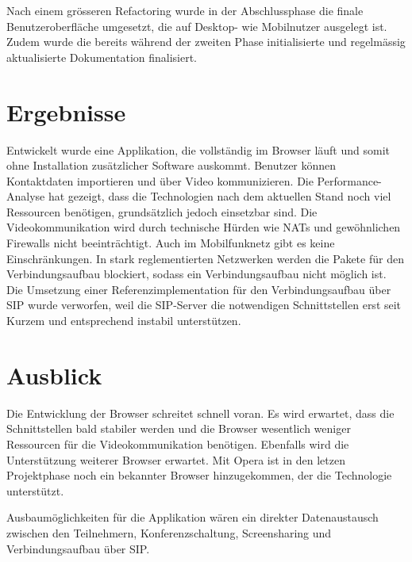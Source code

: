 Nach einem grösseren Refactoring wurde in der Abschlussphase die finale Benutzeroberfläche umgesetzt, die auf Desktop- wie Mobilnutzer ausgelegt ist.
Zudem wurde die bereits während der zweiten Phase initialisierte und regelmässig aktualisierte Dokumentation finalisiert.


\section{Ergebnisse}
Entwickelt wurde eine Applikation, die vollständig im Browser läuft und somit ohne Installation zusätzlicher Software auskommt.
Benutzer können Kontaktdaten importieren und über Video kommunizieren.
Die Performance-Analyse hat gezeigt, dass die Technologien nach dem aktuellen
Stand noch viel Ressourcen benötigen, grundsätzlich jedoch einsetzbar sind.
Die Videokommunikation wird durch technische Hürden wie NATs und gewöhnlichen Firewalls nicht beeinträchtigt. Auch im Mobilfunknetz gibt es keine Einschränkungen.
In stark reglementierten Netzwerken werden die Pakete für den Verbindungsaufbau blockiert, sodass ein Verbindungsaufbau nicht möglich ist.
Die Umsetzung einer Referenzimplementation für den Verbindungsaufbau über SIP
wurde verworfen, weil die SIP-Server die notwendigen Schnittstellen erst seit Kurzem und entsprechend instabil unterstützen.


\section{Ausblick}
Die Entwicklung der Browser schreitet schnell voran. Es wird erwartet, dass die
Schnittstellen bald stabiler werden und die Browser wesentlich weniger Ressourcen für die Videokommunikation benötigen. Ebenfalls wird die Unterstützung weiterer Browser erwartet. Mit Opera ist in den letzen Projektphase noch ein bekannter Browser hinzugekommen, der die Technologie unterstützt.

Ausbaumöglichkeiten für die Applikation wären ein direkter Datenaustausch
zwischen den Teilnehmern, Konferenzschaltung, Screensharing und Verbindungsaufbau über SIP.
